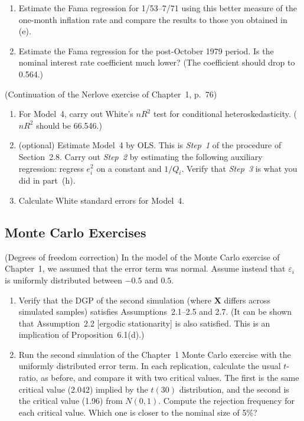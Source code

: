 \begin{problemset}
\begin{enumerate}[label=(\alph*),start=4]
\item Estimate the Fama regression for 1/53--7/71 using this better measure of
the one-month inflation rate and compare the results to those you obtained
in (e).

\item Estimate the Fama regression for the post-October 1979 period. Is the nominal interest rate coefficient much lower? (The coefficient should drop to
0.564.)
\end{enumerate}

\exercise[2] (Continuation of the Nerlove exercise of Chapter~1, p.~76)

\begin{enumerate}[label=(\alph*),start=9]
\item For Model~4, carry out White's $nR^2$ test for conditional heteroskedasticity.
($nR^2$ should be 66.546.)

\item (optional)\quad
Estimate Model~4 by OLS. This is \emph{Step~1} of the procedure of
Section~2.8. Carry out \emph{Step~2} by estimating the following auxiliary regression: regress $e_i^2$ on a constant and $1/Q_i$. Verify that \emph{Step~3} is what you did
in part~(h).

\item Calculate White standard errors for Model~4.
\end{enumerate}

\subsection*{Monte Carlo Exercises}

\exercise[1] (Degrees of freedom correction)\quad
In the model of the Monte Carlo exercise of
Chapter~1, we assumed that the error term was normal. Assume instead that $\varepsilon_i$
is uniformly distributed between $-0.5$ and $0.5$.

\begin{enumerate}[label=(\alph*)]
\item Verify that the DGP of the second simulation (where $\mathbf{X}$ differs across simulated samples) satisfies Assumptions~2.1--2.5 and 2.7. (It can be shown that
Assumption~2.2 [ergodic stationarity] is also satisfied. This is an implication of Proposition~6.1(d).)

\item Run the second simulation of the Chapter~1 Monte Carlo exercise with the
uniformly distributed error term. In each replication, calculate the usual
$t$-ratio, as before, and compare it with two critical values. The first is the
same critical value (2.042) implied by the $t(30)$ distribution, and the second
is the critical value (1.96) from $N(0, 1)$. Compute the rejection frequency
for each critical value. Which one is closer to the nominal size of 5\%?
\end{enumerate}


\end{problemset}
